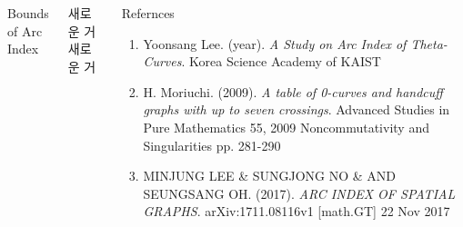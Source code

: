 \documentclass[final]{beamer}
\begin{document}
\begin{frame}[t]
\begin{columns}[t]
\begin{block}{Bounds of Arc Index}
\begin{itemize}
    \end{itemize}
  \end{block}
  \begin{block}{새로운 거}
    새로운 거
  \end{block}
  \begin{block}{Refernces}
    \begin{enumerate}
      \item Yoonsang Lee. (year). \textit{A Study on Arc Index of Theta-Curves}. Korea Science Academy of KAIST
      \item H. Moriuchi. (2009). \textit{A table of 0-curves and handcuff graphs with up to seven crossings}. Advanced Studies in Pure Mathematics 55, 2009 Noncommutativity and Singularities
pp. 281-290
      \item MINJUNG LEE & SUNGJONG NO & AND SEUNGSANG OH. (2017). \textit{ARC INDEX OF SPATIAL GRAPHS}. arXiv:1711.08116v1 [math.GT] 22 Nov 2017
    \end{enumerate}
  \end{block}
\end{columns}



\end{frame}
\end{document}
